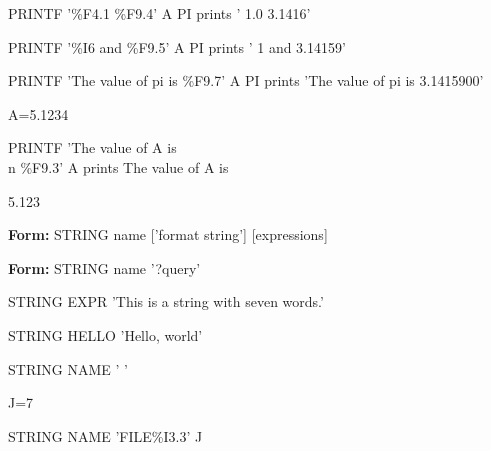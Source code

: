 {\newpage\clearpage
{}%
\begin{example}
  \item[PRINTF '\%F4.1 \%F9.4' A PI\hfill]{ prints ' 1.0    3.1416'}
  \item[PRINTF '\%I6 and \%F9.5' A PI\hfill]{ prints '     1 and   3.14159'}
  \item[PRINTF 'The value of pi is \%F9.7' A PI\hfill]{ prints 
'The value of pi is 3.1415900'}
\end{example}%
\lthtmlfigureZ
\lthtmlcheckvsize\clearpage}

{\newpage\clearpage
{}%
\begin{example}
  \item[A=5.1234\hfill]{}
  \item[PRINTF 'The value of A is \\n    \%F9.3' A\hfill]{prints
The value of A is}
  \item{5.123}
\end{example}%
\lthtmlfigureZ
\lthtmlcheckvsize\clearpage}

{\newpage\clearpage
{}%
\begin{command}
  \item[\textbf{Form: } STRING name {['format string']} {[expressions]}\hfill]{}
  \item[\textbf{Form: } STRING name '?query']{}
\end{command}%
\lthtmlfigureZ
\lthtmlcheckvsize\clearpage}

{\newpage\clearpage
{}%
\begin{example}
  \item[STRING EXPR  'This is a string with seven words.'\hfill]{}
  \item[STRING HELLO 'Hello, world'\hfill]{}
\end{example}%
\lthtmlfigureZ
\lthtmlcheckvsize\clearpage}

{\newpage\clearpage
{}%
\begin{hanging}
  \item{STRING NAME ' '}
\end{hanging}%
\lthtmlfigureZ
\lthtmlcheckvsize\clearpage}

{\newpage\clearpage
{}%
\begin{hanging}
  \item{J=7}
  \item{STRING NAME 'FILE\%I3.3' J}
\end{hanging}%
\lthtmlfigureZ
\lthtmlcheckvsize\clearpage}

